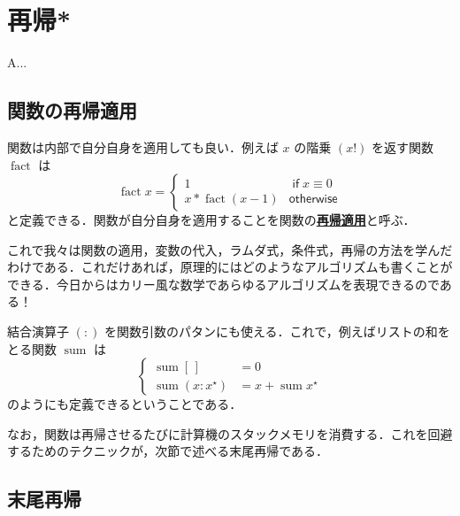 \documentclass[a4paper,twocolumn]{jsbook}
\newenvironment{leader}{\begingroup\gt}{\endgroup}
\newcommand{\keyword}[1]{{\underline{\textbf{#1}}}}
\newcommand{\mKeyword}[1]{\mathsf{#1}} %
\newcommand{\mIfKeyword}{\mKeyword{if}}
\newcommand{\mOtherwiseKeyword}{\mKeyword{otherwise}}
\DeclareMathOperator{\mIf}{\mIfKeyword}
\DeclareMathOperator{\mOtherwise}{\mOtherwiseKeyword}
\newcommand{\mEmptyList}{{[\,]}}
\DeclareMathOperator{\mFact}{fact}
\DeclareMathOperator{\mSum}{sum}
\newcommand{\mList}[1]{{#1}^\mathrm{\star}}
\begin{document}
\chapter{再帰*}

\begin{leader}
A...
\end{leader}


\section{関数の再帰適用}

関数は内部で自分自身を適用しても良い．例えば $x$ の階乗 $(x!)$ を返す関数 $\mFact$ は
\begin{equation}
\mFact x=\begin{cases}
1&\mIf x\equiv0\\
x*\mFact(x-1)&\mOtherwise
\end{cases}
\end{equation}
と定義できる．関数が自分自身を適用することを関数の\keyword{再帰適用}と呼ぶ．

これで我々は関数の適用，変数の代入，ラムダ式，条件式，再帰の方法を学んだわけである．これだけあれば，原理的にはどのようなアルゴリズムも書くことができる．今日からはカリー風な数学であらゆるアルゴリズムを表現できるのである！

結合演算子 $(:)$ を関数引数のパタンにも使える．これで，例えばリストの和をとる関数 $\mSum$ は
\begin{equation}
\left\{
\begin{split}
\mSum\mEmptyList&=0\\
\mSum(x:\mList{x})&=x+\mSum\mList{x}
\end{split}
\right.
\end{equation}
のようにも定義できるということである．

なお，関数は再帰させるたびに計算機のスタックメモリを消費する．これを回避するためのテクニックが，次節で述べる末尾再帰である．

\section{末尾再帰}
\end{document}
